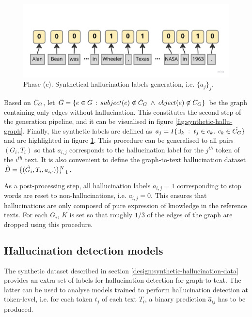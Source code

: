 \begin{figure}
    \centering
    \includegraphics[scale=0.18]{figures/design/synthetic/hallu_labels.jpg}
    \caption{Phase (c). Synthetical hallucination labels generation, i.e. $\{a_j\}_j$.}
    \label{fig:synthetic-hallu-labels}
\end{figure}
\newpage
Based on $\Tilde{C}_G$, let $\Tilde{G} = \{e \in G \,:\, subject(e) \not\in \Tilde{C}_G \;\land\; object(e) \not\in \Tilde{C}_G\}$ be the graph containing only edges without hallucination. This constitutes the second step of the generation pipeline, and it can be visualised in figure \ref{fig:synthetic-hallu-graph}. Finally, the synthetic labels are defined as $a_{j} = I\{\exists_k \;:\; t_j \in c_k, \; c_k \in \Tilde{C_G}\}$ and are highlighted in figure \ref{fig:synthetic-hallu-labels}. This procedure can be generalised to all pairs $(G_i, T_i)$ so that $a_{i,j}$ corresponds to the hallucination label for the $j^{th}$ token of the $i^{th}$ text. It is also convenient to define the graph-to-text hallucination dataset $\Tilde{D} = \{(\Tilde{G_i}, T_i, a_{i, \cdot})\}_{i=1}^N$.

As a post-processing step, all hallucination labels $a_{i,j} = 1 $ corresponding to stop words are reset to non-hallucinations, i.e. $a_{i,j} = 0$. This ensures that hallucinations are only composed of pure expression of knowledge in the reference texts. For each $G_i$, $K$ is set so that roughly $1/3$ of the edges of the graph are dropped using this procedure.  

\subsection{Hallucination detection models} \label{design:hallucination-detection-models}

The synthetic dataset described in section \ref{design:synthetic-hallucination-data} provides an extra set of labels for hallucination detection for graph-to-text. The latter can be used to analyse models trained to perform hallucination detection at token-level, i.e. for each token $t_j$ of each text $T_i$, a binary prediction $\hat a_{ij}$ has to be produced.

